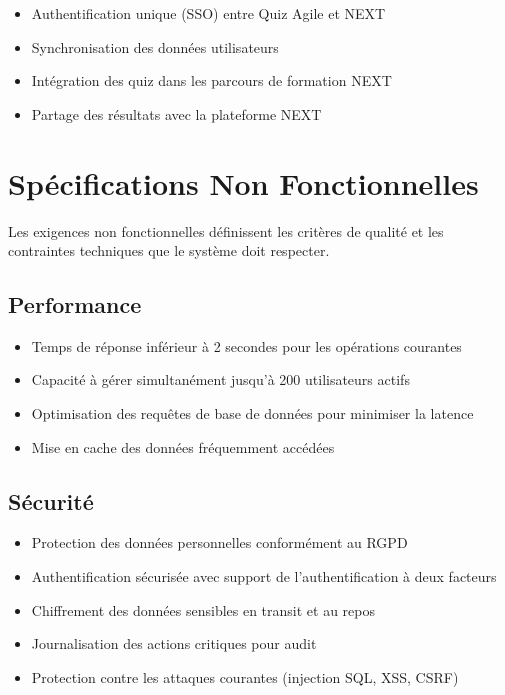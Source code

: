 \documentclass[12pt,a4paper]{report}
\begin{document}
\begin{itemize}
\item Authentification unique (SSO) entre Quiz Agile et NEXT
\item Synchronisation des données utilisateurs
\item Intégration des quiz dans les parcours de formation NEXT
\item Partage des résultats avec la plateforme NEXT
\end{itemize}

\section{Spécifications Non Fonctionnelles}

Les exigences non fonctionnelles définissent les critères de qualité et les contraintes techniques que le système doit respecter.

\subsection{Performance}

\begin{itemize}
\item Temps de réponse inférieur à 2 secondes pour les opérations courantes
\item Capacité à gérer simultanément jusqu'à 200 utilisateurs actifs
\item Optimisation des requêtes de base de données pour minimiser la latence
\item Mise en cache des données fréquemment accédées
\end{itemize}

\subsection{Sécurité}

\begin{itemize}
\item Protection des données personnelles conformément au RGPD
\item Authentification sécurisée avec support de l'authentification à deux facteurs
\item Chiffrement des données sensibles en transit et au repos
\item Journalisation des actions critiques pour audit
\item Protection contre les attaques courantes (injection SQL, XSS, CSRF)
\end{itemize}
\end{document}
